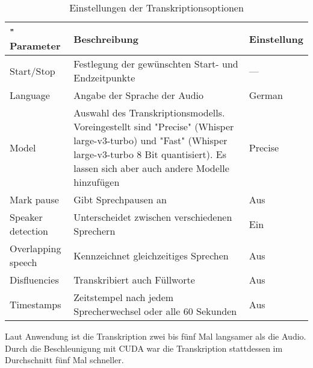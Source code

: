 \begin{table}
    \centering
    \begin{tabulary}{\textwidth}{lLl}
        \toprule"
        \textbf{Parameter} & \textbf{Beschreibung} & \textbf{Einstellung} \\
        \midrule
        Start/Stop & Festlegung der gewünschten Start- und Endzeitpunkte & --- \\
        Language & Angabe der Sprache der Audio & German \\
        Model & Auswahl des Transkriptionsmodells. Voreingestellt sind "Precise" (Whisper large-v3-turbo) und "Fast" (Whisper large-v3-turbo 8 Bit quantisiert). Es lassen sich aber auch andere Modelle hinzufügen & Precise \\
        Mark pause & Gibt Sprechpausen an & Aus \\
        Speaker detection & Unterscheidet zwischen verschiedenen Sprechern & Ein \\
        Overlapping speech & Kennzeichnet gleichzeitiges Sprechen & Aus \\
        Disfluencies & Transkribiert auch Füllworte & Aus \\
        Timestamps & Zeitstempel nach jedem Sprecherwechsel oder alle 60 Sekunden & Aus \\
        \bottomrule
    \end{tabulary}
    \caption{Einstellungen der Transkriptionsoptionen}
    \label{tab:transkription_einstellungen}
\end{table}


Laut Anwendung ist die Transkription zwei bis fünf Mal langsamer als die Audio.
Durch die Beschleunigung mit CUDA war die Transkription stattdessen im Durchschnitt fünf Mal schneller.